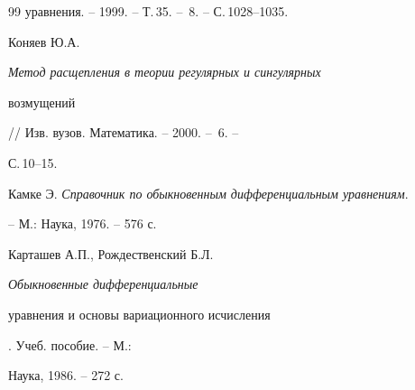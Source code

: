 \begin{thebibliography}{99}
уравнения. -- 1999. -- Т.\,35. -- \No\,8. -- С.\,1028--1035. 




Коняев Ю.А. {\em Метод расщепления в теории регулярных и сингулярных 


возмущений} // Изв. вузов. Математика. -- 2000. -- \No\,6. -- 


С.\,10--15. 




Камке Э. {\em Справочник по обыкновенным дифференциальным уравнениям}. 


-- М.: Наука, 1976. -- 576 с. 




Карташев А.П., Рождественский Б.Л. {\em Обыкновенные дифференциальные 


уравнения и основы вариационного исчисления}. Учеб. пособие. -- М.: 


Наука, 1986. -- 272 с. 


 


 


\end{thebibliography} 


 


\vskip 2cm 


 








 


\label{end} 


 


